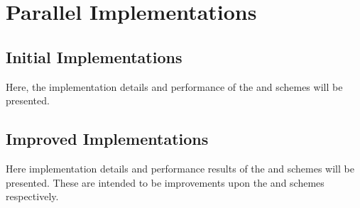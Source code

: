 \chapter{Parallel Implementations}



\section{Initial Implementations}
Here, the implementation details and performance of the
\replicateddata{} and \systolicloop{} schemes will be presented.




\section{Improved Implementations}
Here implementation details and performance results of
the \sharedandreplicateddata{} and \replicatedsystolicloop{}
schemes will be presented.
%
These are intended to be improvements upon the \replicateddata{}
and \systolicloop{} schemes respectively.


